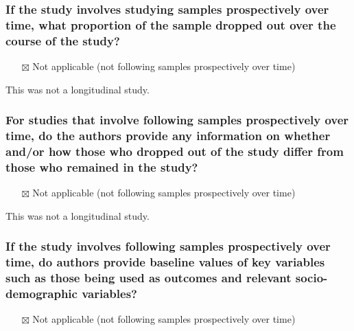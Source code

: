 \documentclass[
  doc, a4paper]{apa7}
\providecommand{\tightlist}{%
  \setlength{\itemsep}{0pt}\setlength{\parskip}{0pt}}
\begin{document}
\subsubsection{If the study involves studying samples prospectively over time, what proportion of the sample dropped out over the course of the study?}\label{if-the-study-involves-studying-samples-prospectively-over-time-what-proportion-of-the-sample-dropped-out-over-the-course-of-the-study}

\begin{itemize}
\tightlist
\item[$\boxtimes$]
  Not applicable (not following samples prospectively over time)
\end{itemize}

This was not a longitudinal study.

\subsubsection{For studies that involve following samples prospectively over time, do the authors provide any information on whether and/or how those who dropped out of the study differ from those who remained in the study?}\label{for-studies-that-involve-following-samples-prospectively-over-time-do-the-authors-provide-any-information-on-whether-andor-how-those-who-dropped-out-of-the-study-differ-from-those-who-remained-in-the-study}

\begin{itemize}
\tightlist
\item[$\boxtimes$]
  Not applicable (not following samples prospectively over time)
\end{itemize}

This was not a longitudinal study.

\subsubsection{If the study involves following samples prospectively over time, do authors provide baseline values of key variables such as those being used as outcomes and relevant socio-demographic variables?}\label{if-the-study-involves-following-samples-prospectively-over-time-do-authors-provide-baseline-values-of-key-variables-such-as-those-being-used-as-outcomes-and-relevant-socio-demographic-variables}

\begin{itemize}
\tightlist
\item[$\boxtimes$]
  Not applicable (not following samples prospectively over time)
\end{itemize}
\end{document}
